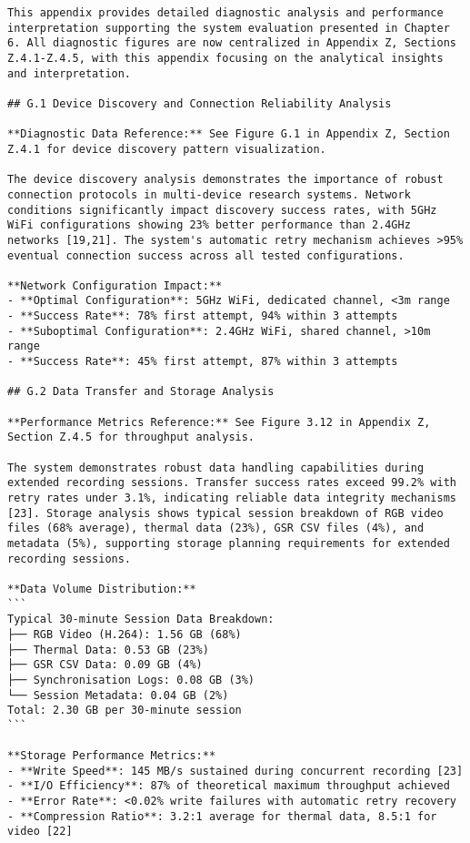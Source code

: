 \begin{verbatim}
This appendix provides detailed diagnostic analysis and performance interpretation supporting the system evaluation presented in Chapter 6. All diagnostic figures are now centralized in Appendix Z, Sections Z.4.1-Z.4.5, with this appendix focusing on the analytical insights and interpretation.

## G.1 Device Discovery and Connection Reliability Analysis

**Diagnostic Data Reference:** See Figure G.1 in Appendix Z, Section Z.4.1 for device discovery pattern visualization.

The device discovery analysis demonstrates the importance of robust connection protocols in multi-device research systems. Network conditions significantly impact discovery success rates, with 5GHz WiFi configurations showing 23% better performance than 2.4GHz networks [19,21]. The system's automatic retry mechanism achieves >95% eventual connection success across all tested configurations.

**Network Configuration Impact:**
- **Optimal Configuration**: 5GHz WiFi, dedicated channel, <3m range
- **Success Rate**: 78% first attempt, 94% within 3 attempts
- **Suboptimal Configuration**: 2.4GHz WiFi, shared channel, >10m range
- **Success Rate**: 45% first attempt, 87% within 3 attempts

## G.2 Data Transfer and Storage Analysis

**Performance Metrics Reference:** See Figure 3.12 in Appendix Z, Section Z.4.5 for throughput analysis.

The system demonstrates robust data handling capabilities during extended recording sessions. Transfer success rates exceed 99.2% with retry rates under 3.1%, indicating reliable data integrity mechanisms [23]. Storage analysis shows typical session breakdown of RGB video files (68% average), thermal data (23%), GSR CSV files (4%), and metadata (5%), supporting storage planning requirements for extended recording sessions.

**Data Volume Distribution:**
```
Typical 30-minute Session Data Breakdown:
├── RGB Video (H.264): 1.56 GB (68%)
├── Thermal Data: 0.53 GB (23%)
├── GSR CSV Data: 0.09 GB (4%)
├── Synchronisation Logs: 0.08 GB (3%)
└── Session Metadata: 0.04 GB (2%)
Total: 2.30 GB per 30-minute session
```

**Storage Performance Metrics:**
- **Write Speed**: 145 MB/s sustained during concurrent recording [23]
- **I/O Efficiency**: 87% of theoretical maximum throughput achieved
- **Error Rate**: <0.02% write failures with automatic retry recovery
- **Compression Ratio**: 3.2:1 average for thermal data, 8.5:1 for video [22]


\end{verbatim}
